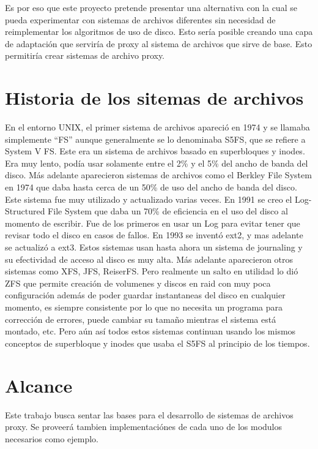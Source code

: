Es por eso que este proyecto pretende presentar una alternativa con la cual se pueda experimentar con sistemas de archivos diferentes sin necesidad de reimplementar los algoritmos de uso de disco. Esto sería posible creando una capa de adaptación que serviría de proxy al sistema de archivos que sirve de base. Esto permitiría crear sistemas de archivo proxy.


\section{Historia de los sitemas de archivos}

En el entorno UNIX, el primer sistema de archivos apareció en 1974 y se llamaba simplemente ``FS'' aunque generalmente se lo denominaba S5FS, que se refiere a System V FS. Este era un sistema de archivos basado en superbloques y inodes. Era muy lento, podía usar solamente entre el 2\% y el 5\% del ancho de banda del disco. Más adelante aparecieron sistemas de archivos como el Berkley File System en 1974 que daba hasta cerca de un 50\% de uso del ancho de banda del disco. Este sistema fue muy utilizado y actualizado varias veces. En 1991 se creo el Log-Structured File System que daba un 70\% de eficiencia en el uso del disco al momento de escribir. Fue de los primeros en usar un Log para evitar tener que revisar todo el disco en casos de fallos. En 1993 se inventó ext2, y mas adelante se actualizó a ext3. Estos sistemas usan hasta ahora un sistema de journaling y su efectividad de acceso al disco es muy alta. Más adelante aparecieron otros sistemas como XFS, JFS, ReiserFS. Pero realmente un salto en utilidad lo dió ZFS que permite creación de volumenes y discos en raid con muy poca configuración además de poder guardar instantaneas del disco en cualquier momento, es siempre consistente por lo que no necesita un programa para corrección de errores, puede cambiar su tamaño mientras el sistema está montado, etc. Pero aún así todos estos sistemas continuan usando los mismos conceptos de superbloque y inodes que usaba el S5FS al principio de los tiempos.


\section{Alcance}

Este trabajo busca sentar las bases para el desarrollo de sistemas de archivos proxy. Se proveerá tambien implementaciónes de cada uno de los modulos necesarios como ejemplo.


